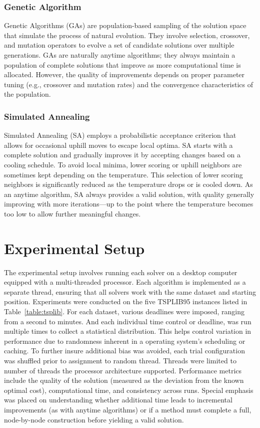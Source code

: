 \documentclass[11pt]{article}
\begin{document}
	\subsubsection{Genetic Algorithm}
	Genetic Algorithms (GAs) are population-based sampling of the solution space that simulate the process of natural evolution. They involve selection, crossover, and mutation operators to evolve a set of candidate solutions over multiple generations\cite{wikipedia_genetic_algorithm}. GAs are naturally anytime algorithms; they always maintain a population of complete solutions that improve as more computational time is allocated. However, the quality of improvements depends on proper parameter tuning (e.g., crossover and mutation rates) and the convergence characteristics of the population.
	
	\subsubsection{Simulated Annealing}
	Simulated Annealing (SA) employs a probabilistic acceptance criterion that allows for occasional uphill moves to escape local optima\cite{wikipedia_simulated_annealing}. SA starts with a complete solution and gradually improves it by accepting changes based on a cooling schedule. To avoid local minima, lower scoring or uphill neighbors are sometimes kept depending on the temperature. This selection of lower scoring neighbors is significantly reduced as the temperature drops or is cooled down. As an anytime algorithm, SA always provides a valid solution, with quality generally improving with more iterations—up to the point where the temperature becomes too low to allow further meaningful changes.
	
	\section{Experimental Setup}
	The experimental setup involves running each solver on a desktop computer equipped with a multi-threaded processor. Each algorithm is implemented as a separate thread, ensuring that all solvers work with the same dataset and starting position. Experiments were conducted on the five TSPLIB95 instances listed in Table~\ref{table:tsplib}. For each dataset, various deadlines were imposed, ranging from a second to minutes. And each individual time control or deadline, was run multiple times to collect a statistical distribution. This helps control variation in performance due to randomness inherent in a operating system's scheduling or caching. To further insure additional bias was avoided, each trial configuration was shuffled prior to assignment to random thread. Threads were limited to number of threads the processor architecture supported.
	Performance metrics include the quality of the solution (measured as the deviation from the known optimal cost), computational time, and consistency across runs. Special emphasis was placed on understanding whether additional time leads to incremental improvements (as with anytime algorithms) or if a method must complete a full, node-by-node construction before yielding a valid solution.
	
\end{document}
